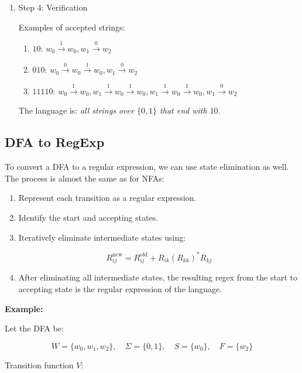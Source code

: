 \documentclass[12pt,a4paper,openany]{article}
\begin{document}
\begin{enumerate}
The final regular expression is:

\[
\boxed{(0+1)^*10}
\]


\item Step 4: Verification

Examples of accepted strings:

\begin{enumerate}
    \item $10$: $w_0 \xrightarrow{1} w_0, w_1 \xrightarrow{0} w_2$ 
    \item $010$: $w_0 \xrightarrow{0} w_0 \xrightarrow{1} w_0, w_1 \xrightarrow{0} w_2$ 
    \item $11110$: $w_0 \xrightarrow{1} w_0,w_1 \xrightarrow{1} w_0 \xrightarrow{1} w_0,w_1 \xrightarrow{1} w_0 \xrightarrow{1} w_0,w_1 \xrightarrow{0} w_2$ 
\end{enumerate}

The language is: \emph{all strings over $\{0,1\}$ that end with $10$}.

\end{enumerate}

\subsection{DFA to RegExp}

To convert a DFA to a regular expression, we can use state elimination as well.  
The process is almost the same as for NFAs:

\begin{enumerate}
    \item Represent each transition as a regular expression.
    \item Identify the start and accepting states.
    \item Iteratively eliminate intermediate states using:
    
    \[
    R_{ij}^{\text{new}} = R_{ij}^{\text{old}} + R_{ik} (R_{kk})^* R_{kj}
    \]

    \item After eliminating all intermediate states, the resulting regex from the start to accepting state is the regular expression of the language.
\end{enumerate}

\textbf{Example:}

Let the DFA be:

\[
W = \{w_0, w_1, w_2\}, \quad
\Sigma = \{0,1\}, \quad
S = \{w_0\}, \quad
F = \{w_2\}
\]

Transition function $V$:
\end{document}

